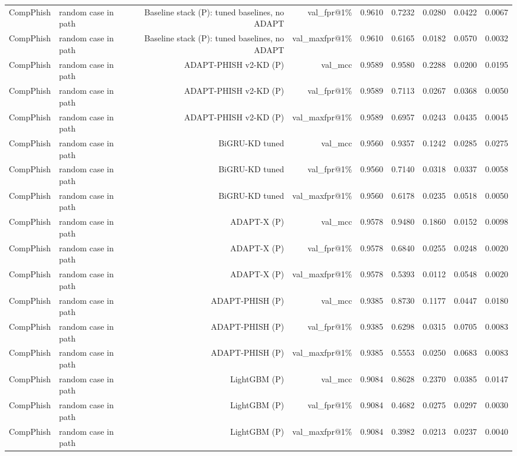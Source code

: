 \begin{table}[t]
\begin{tabular}{llrrrrrrr}
CompPhish & random case in path & Baseline stack (P): tuned baselines, no ADAPT & val\_fpr@1\% & 0.9610 & 0.7232 & 0.0280 & 0.0422 & 0.0067 \\
CompPhish & random case in path & Baseline stack (P): tuned baselines, no ADAPT & val\_maxfpr@1\% & 0.9610 & 0.6165 & 0.0182 & 0.0570 & 0.0032 \\
CompPhish & random case in path & ADAPT-PHISH v2-KD (P) & val\_mcc & 0.9589 & 0.9580 & 0.2288 & 0.0200 & 0.0195 \\
CompPhish & random case in path & ADAPT-PHISH v2-KD (P) & val\_fpr@1\% & 0.9589 & 0.7113 & 0.0267 & 0.0368 & 0.0050 \\
CompPhish & random case in path & ADAPT-PHISH v2-KD (P) & val\_maxfpr@1\% & 0.9589 & 0.6957 & 0.0243 & 0.0435 & 0.0045 \\
CompPhish & random case in path & BiGRU-KD tuned & val\_mcc & 0.9560 & 0.9357 & 0.1242 & 0.0285 & 0.0275 \\
CompPhish & random case in path & BiGRU-KD tuned & val\_fpr@1\% & 0.9560 & 0.7140 & 0.0318 & 0.0337 & 0.0058 \\
CompPhish & random case in path & BiGRU-KD tuned & val\_maxfpr@1\% & 0.9560 & 0.6178 & 0.0235 & 0.0518 & 0.0050 \\
CompPhish & random case in path & ADAPT-X (P) & val\_mcc & 0.9578 & 0.9480 & 0.1860 & 0.0152 & 0.0098 \\
CompPhish & random case in path & ADAPT-X (P) & val\_fpr@1\% & 0.9578 & 0.6840 & 0.0255 & 0.0248 & 0.0020 \\
CompPhish & random case in path & ADAPT-X (P) & val\_maxfpr@1\% & 0.9578 & 0.5393 & 0.0112 & 0.0548 & 0.0020 \\
CompPhish & random case in path & ADAPT-PHISH (P) & val\_mcc & 0.9385 & 0.8730 & 0.1177 & 0.0447 & 0.0180 \\
CompPhish & random case in path & ADAPT-PHISH (P) & val\_fpr@1\% & 0.9385 & 0.6298 & 0.0315 & 0.0705 & 0.0083 \\
CompPhish & random case in path & ADAPT-PHISH (P) & val\_maxfpr@1\% & 0.9385 & 0.5553 & 0.0250 & 0.0683 & 0.0083 \\
CompPhish & random case in path & LightGBM (P) & val\_mcc & 0.9084 & 0.8628 & 0.2370 & 0.0385 & 0.0147 \\
CompPhish & random case in path & LightGBM (P) & val\_fpr@1\% & 0.9084 & 0.4682 & 0.0275 & 0.0297 & 0.0030 \\
CompPhish & random case in path & LightGBM (P) & val\_maxfpr@1\% & 0.9084 & 0.3982 & 0.0213 & 0.0237 & 0.0040 \\

\end{tabular}
\end{table}
